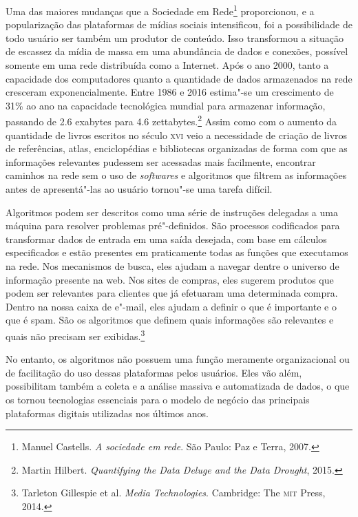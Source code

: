 Uma das maiores mudanças que a Sociedade em Rede\footnote{Manuel Castells. \emph{A sociedade em rede}. São Paulo: Paz e Terra, 2007.}
proporcionou, e a popularização das plataformas de mídias sociais
intensificou, foi a possibilidade de todo usuário ser também um produtor
de conteúdo. Isso transformou a situação de escassez da mídia de massa
em uma abundância de dados e conexões, possível somente em uma rede
distribuída como a Internet. Após o ano 2000, tanto a capacidade dos
computadores quanto a quantidade de dados armazenados na rede
cresceram exponencialmente. Entre 1986 e 2016 estima"-se um crescimento de
31\% ao ano na capacidade tecnológica mundial para armazenar informação,
passando de 2.6 exabytes para 4.6 zettabytes.\footnote{Martin Hilbert. \emph{Quantifying the Data Deluge and the Data Drought}, 2015.} Assim como
com o aumento da quantidade de livros escritos no século \textsc{xvi} veio a
necessidade de criação de livros de referências, atlas, enciclopédias e
bibliotecas organizadas de forma com que as informações relevantes
pudessem ser acessadas mais facilmente, encontrar caminhos na rede sem o
uso de \emph{softwares} e algoritmos que filtrem as informações antes de
apresentá"-las ao usuário tornou"-se uma tarefa difícil.


Algoritmos podem ser descritos como uma série de instruções delegadas a
uma máquina para resolver problemas pré"-definidos. São processos
codificados para transformar dados de entrada em uma saída desejada, com
base em cálculos especificados e estão presentes em praticamente todas
as funções que executamos na rede. Nos mecanismos de busca, eles ajudam
a navegar dentre o universo de informação presente na web. Nos sites de
compras, eles sugerem produtos que podem ser relevantes para clientes
que já efetuaram uma determinada compra. Dentro na nossa caixa de
e"-mail, eles ajudam a definir o que é importante e o que é spam. São os
algoritmos que definem quais informações são relevantes e quais não
precisam ser exibidas.\footnote{Tarleton Gillespie et al. \emph{Media
Technologies}. Cambridge: The \textsc{mit} Press, 2014.}

No entanto, os algoritmos não possuem uma função meramente
organizacional ou de facilitação do uso dessas plataformas pelos
usuários. Eles vão além, possibilitam também a coleta e a análise
massiva e automatizada de dados, o que os tornou tecnologias essenciais
para o modelo de negócio das principais plataformas digitais utilizadas
nos últimos anos.

